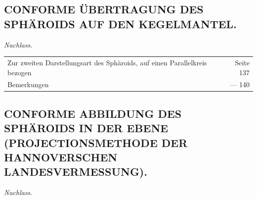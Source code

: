 \documentclass[12pt,a4paper]{article}
\theoremstyle{plain}
\theoremstyle{definition}
\theoremstyle{remark}
\begin{document}
\subsection*{CONFORME ÜBERTRAGUNG DES SPHÄROIDS AUF DEN KEGELMANTEL.}

\textit{Nachlass.}

\noindent
\begin{tabular}{@{}p{12cm}r@{}}
Zur zweiten Darstellungsart des Sphäroids, auf einen Parallelkreis bezogen & \dotfill Seite 137 \\
Bemerkungen & \dotfill --- 140 \\
\end{tabular}

\medskip
\subsection*{CONFORME ABBILDUNG DES SPHÄROIDS IN DER EBENE\\(PROJECTIONSMETHODE DER HANNOVERSCHEN LANDESVERMESSUNG).}

\textit{Nachlass.}
\end{document}
